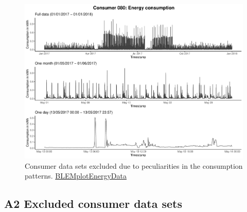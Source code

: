\begin{centering}
\begin{figure}[!htbp]
        \includegraphics[width=\textwidth-0.85cm]{thesis/graphs/timeseries/c080_cons.pdf}
        \caption[Consumer data sets excluded due to peculiarities in the consumption patterns]{Consumer data sets excluded due to peculiarities in the consumption patterns. \quantnet\href{ }{BLEMplotEnergyData}}
        \label{App:Fig:excludedcons}
\end{figure}
\end{centering}


\subsection*{A2 Excluded consumer data sets}\label{App:Figures:Excludedp}

